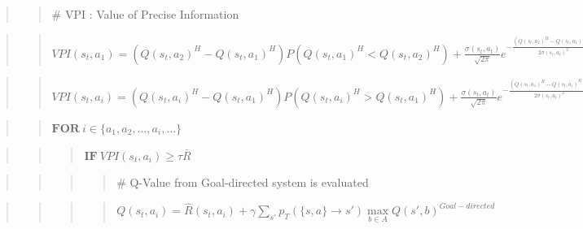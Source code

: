 \documentclass[10pt,a4paper,onecolumn]{article}
\begin{document}
\begin{quote}
\begin{quote}
\(\#\) VPI : Value of Precise Information
\end{quote}
\end{quote}

\begin{quote}
\begin{quote}
\(VPI(s_t, a_1) = (Q(s_t,a_2)^{H}-Q(s_t,a_1)^{H})P(Q(s_t,a_1)^{H}<Q(s_t,a_2)^{H})+ \frac{\sigma(s_t,a_t)}{\sqrt{2\pi}} e^{-\frac{(Q(s_t,a_2)^H - Q(s_t,a_1)^H)^2}{2\sigma(s_t,a_t)^2}}\)
\end{quote}
\end{quote}

\begin{quote}
\begin{quote}
\(VPI(s_t, a_i) = (Q(s_t,a_i)^{H}-Q(s_t,a_1)^{H})P(Q(s_t,a_i)^{H}>Q(s_t,a_1)^{H}) + \frac{\sigma(s_t,a_t)}{\sqrt{2\pi}} e^{-\frac{(Q(s_t,a_1)^H - Q(s_t,a_i)^H)^2}{2\sigma(s_t,a_t)^2}}\)
\end{quote}
\end{quote}

\begin{quote}
\begin{quote}
\(\textbf{FOR}\ i \in \{a_1, a_2,\ldots, a_i, \ldots\}\)
\end{quote}
\end{quote}

\begin{quote}
\begin{quote}
\begin{quote}
\(\textbf{IF}\ VPI(s_t, a_i) \geq \tau \bar{R}\)
\end{quote}
\end{quote}
\end{quote}

\begin{quote}
\begin{quote}
\begin{quote}
\begin{quote}
\(\#\) Q-Value from Goal-directed system is evaluated
\end{quote}
\end{quote}
\end{quote}
\end{quote}

\begin{quote}
\begin{quote}
\begin{quote}
\begin{quote}
\(Q(s_t,a_i) = \hat{R}(s_t,a_i) + \gamma \sum\limits_{s'}p_{T}(\{s,a\}\rightarrow s') \max\limits_{b \in A} Q(s',b)^{Goal-directed}\)
\end{quote}
\end{quote}
\end{quote}
\end{quote}
\end{document}
